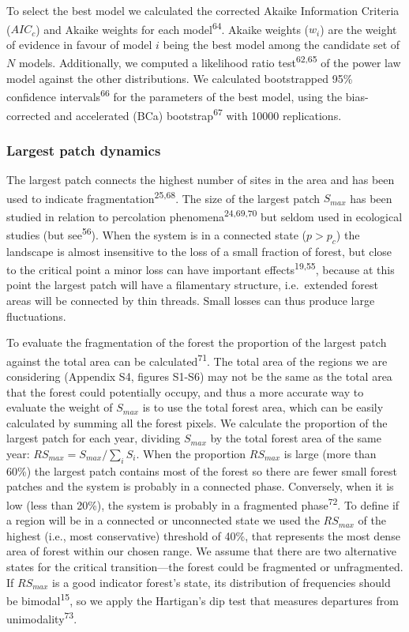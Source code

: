 \documentclass[]{article}
\begin{document}
To select the best model we calculated the corrected Akaike Information
Criteria (\(AIC_c\)) and Akaike weights for each
model\textsuperscript{64}. Akaike weights (\(w_i\)) are the weight of
evidence in favour of model \(i\) being the best model among the
candidate set of \(N\) models. Additionally, we computed a likelihood
ratio test\textsuperscript{62,65} of the power law model against the
other distributions. We calculated bootstrapped 95\% confidence
intervals\textsuperscript{66} for the parameters of the best model,
using the bias-corrected and accelerated (BCa)
bootstrap\textsuperscript{67} with 10000 replications.

\subsubsection{Largest patch dynamics}\label{largest-patch-dynamics}

The largest patch connects the highest number of sites in the area and
has been used to indicate fragmentation\textsuperscript{25,68}. The size
of the largest patch \(S_{max}\) has been studied in relation to
percolation phenomena\textsuperscript{24,69,70} but seldom used in
ecological studies (but see\textsuperscript{56}). When the system is in
a connected state (\(p>p_c\)) the landscape is almost insensitive to the
loss of a small fraction of forest, but close to the critical point a
minor loss can have important effects\textsuperscript{19,55}, because at
this point the largest patch will have a filamentary structure,
i.e.~extended forest areas will be connected by thin threads. Small
losses can thus produce large fluctuations.

To evaluate the fragmentation of the forest the proportion of the
largest patch against the total area can be
calculated\textsuperscript{71}. The total area of the regions we are
considering (Appendix S4, figures S1-S6) may not be the same as the
total area that the forest could potentially occupy, and thus a more
accurate way to evaluate the weight of \(S_{max}\) is to use the total
forest area, which can be easily calculated by summing all the forest
pixels. We calculate the proportion of the largest patch for each year,
dividing \(S_{max}\) by the total forest area of the same year:
\(RS_{max} = S_{max}/\sum_{i}S_i\). When the proportion \(RS_{max}\) is
large (more than 60\%) the largest patch contains most of the forest so
there are fewer small forest patches and the system is probably in a
connected phase. Conversely, when it is low (less than 20\%), the system
is probably in a fragmented phase\textsuperscript{72}. To define if a
region will be in a connected or unconnected state we used the
\(RS_{max}\) of the highest (i.e., most conservative) threshold of 40\%,
that represents the most dense area of forest within our chosen range.
We assume that there are two alternative states for the critical
transition---the forest could be fragmented or unfragmented. If
\(RS_{max}\) is a good indicator forest's state, its distribution of
frequencies should be bimodal\textsuperscript{15}, so we apply the
Hartigan's dip test that measures departures from
unimodality\textsuperscript{73}.
\end{document}
